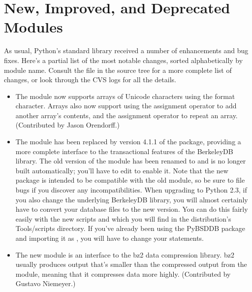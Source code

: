\documentclass{howto}
\begin{document}
\section{New, Improved, and Deprecated Modules}

As usual, Python's standard library received a number of enhancements and
bug fixes.  Here's a partial list of the most notable changes, sorted
alphabetically by module name. Consult the
 file in the source tree for a more
complete list of changes, or look through the CVS logs for all the
details.

\begin{itemize}

\item The  module now supports arrays of Unicode
characters using the  format character.  Arrays also now
support using the \code{+=} assignment operator to add another array's
contents, and the \code{*=} assignment operator to repeat an array.
(Contributed by Jason Orendorff.)

\item The  module has been replaced by version 4.1.1
of the  package,
providing a more complete interface to the transactional features of
the BerkeleyDB library.
The old version of the module has been renamed to 
 and is no longer built automatically; you'll 
have to edit  to enable it.  Note that the new
 package is intended to be compatible with the 
old module, so be sure to file bugs if you discover any
incompatibilities.  When upgrading to Python 2.3, if you also change
the underlying BerkeleyDB library, you will almost certainly have to
convert your database files to the new version.  You can do this
fairly easily with the new scripts  and
 which you will find in the distribution's
Tools/scripts directory.  If you've already been using the PyBSDDB
package and importing it as , you will have to change your
 statements.

\item The new  module is an interface to the bz2 data
compression library.  bz2 usually produces output that's smaller than
the compressed output from the  module, meaning that it
compresses data more highly.  (Contributed by Gustavo Niemeyer.)
 

\end{itemize}
\end{document}
